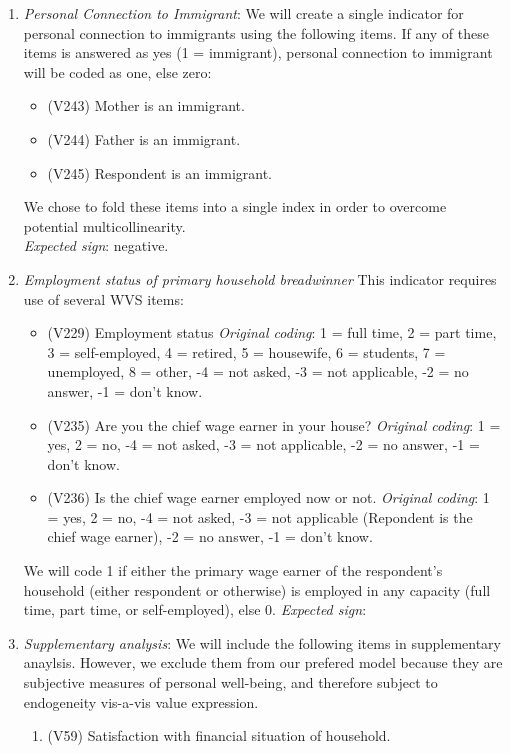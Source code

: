 \documentclass[]{article}
\begin{document}
\begin{enumerate}
  \item \textit{Personal Connection to Immigrant}: We will create a single indicator for personal connection to immigrants using the following items. If any of these items is answered as yes (1 = immigrant), personal connection to immigrant will be coded as one, else zero:
  \begin{itemize}
    \item (V243) Mother is an immigrant.  
    \item (V244) Father is an immigrant. 
    \item (V245) Respondent is an immigrant.  
  \end{itemize}
  We chose to fold these items into a single index in order to overcome potential multicollinearity. \\ \textit{Expected sign}: negative. 
  \item \textit{Employment status of primary household breadwinner} This indicator requires use of several WVS items: 
  \begin{itemize}
  \item (V229) Employment status \textit{Original coding}: 1 = full time, 2 = part time, 3 = self-employed, 4 = retired, 5 = housewife, 6 = students, 7 = unemployed, 8 = other, -4 = not asked, -3 = not applicable, -2 = no answer, -1 = don't know. 
  \item (V235) Are you the chief wage earner in your house? \textit{Original coding}: 1 = yes, 2 = no, -4 = not asked, -3 = not applicable, -2 = no answer, -1 = don't know.
  \item (V236) Is the chief wage earner employed now or not. \textit{Original coding}: 1 = yes, 2 = no, -4 = not asked, -3 = not applicable (Repondent is the chief wage earner), -2 = no answer, -1 = don't know.
  \end{itemize}
  We will code 1 if either the primary wage earner of the respondent's household (either respondent or otherwise) is employed in any capacity (full time, part time, or self-employed), else 0. \textit{Expected sign}: 
  \item \textit{Supplementary analysis}: We will include the following items in supplementary anaylsis. However, we exclude them from our prefered model because they are subjective measures of personal well-being, and therefore subject to endogeneity vis-a-vis value expression. 
  \begin{enumerate}
    \item (V59) Satisfaction with financial situation of household.

\end{enumerate}
\end{enumerate}
\end{document}

